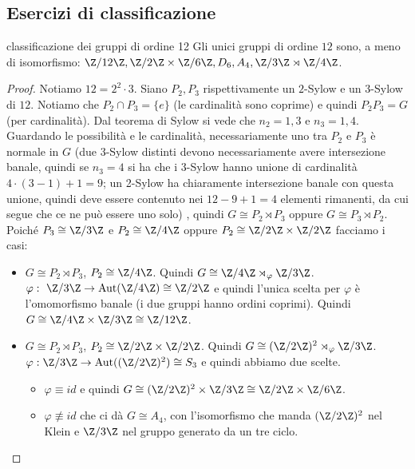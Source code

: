 \subsection{Esercizi di classificazione}
\begin{example2}{classificazione dei gruppi di ordine 12}
    Gli unici gruppi di ordine $12$ sono, a meno di isomorfismo: $\Z/12\Z, \Z/2\Z\times \Z/6\Z, D_6, A_4,\Z/3\Z \rtimes \Z/4\Z$.
\end{example2}
\begin{proof}
    Notiamo $12 = 2^2 \cdot 3$. Siano $P_2,P_3$ rispettivamente un $2$-Sylow e un $3$-Sylow di $12$. Notiamo che $P_2 \cap P_3 = \{e\}$ (le cardinalità sono coprime) e quindi $P_2 P_3 = G$ (per cardinalità). Dal teorema di Sylow si vede che $n_2 = 1, 3$ e $n_3 = 1, 4$.
    Guardando le possibilità e le cardinalità, necessariamente uno tra $P_2$ e $P_3$ è normale in $G$ { \tiny (due $3$-Sylow distinti devono necessariamente avere intersezione banale, quindi se $n_3 = 4$ si ha che i $3$-Sylow hanno unione di cardinalità $4\cdot (3-1) + 1 = 9$; un 2-Sylow ha chiaramente intersezione banale con questa unione, quindi deve essere contenuto nei $12 - 9 + 1 = 4$ elementi rimanenti, da cui segue che ce ne può essere uno solo) }, quindi $G \cong P_2 \rtimes P_3$ oppure $G \cong P_3 \rtimes P_2$. Poiché $P_3 \cong \Z / 3 \Z$ e $P_2 \cong \Z / 4 \Z$ oppure $P_2 \cong \Z / 2\Z \times \Z / 2\Z$ facciamo i casi: 
    \begin{itemize}
        \item $G \cong P_2 \rtimes P_3$, $P_2 \cong \Z / 4 \Z$. Quindi $G \cong  \Z / 4 \Z \rtimes_{\varphi} \Z / 3 \Z$. $\varphi : \  \Z / 3 \Z \rightarrow \text{Aut}(\Z / 4 \Z) \cong \Z / 2 \Z$ e quindi l'unica scelta per $\varphi$ è l'omomorfismo banale (i due gruppi hanno ordini coprimi). Quindi  $G \cong \Z / 4 \Z \times \Z / 3 \Z \cong \Z / 12 \Z$.
        \item $G \cong P_2 \rtimes P_3$, $P_2 \cong \Z/2\Z \times \Z/2\Z$. Quindi $G \cong  (\Z/2\Z)^2 \rtimes_{\varphi} \Z / 3 \Z$. $\varphi :  \Z / 3 \Z \rightarrow \text{Aut}((\Z/2\Z)^2) \cong S_3$ e quindi abbiamo due scelte.
        \begin{itemize}
            \item $\varphi \equiv id$ e quindi  $G \cong (\Z / 2 \Z)^2 \times \Z / 3 \Z \cong \Z / 2 \Z \times \Z / 6 \Z$.
            \item $\varphi \not\equiv id$ che ci dà $G \cong A_4$, con l'isomorfismo che manda $(\Z / 2 \Z)^2$ nel Klein e $\Z / 3 \Z$ nel gruppo generato da un tre ciclo.

\end{itemize}
\end{itemize}
\end{proof}

